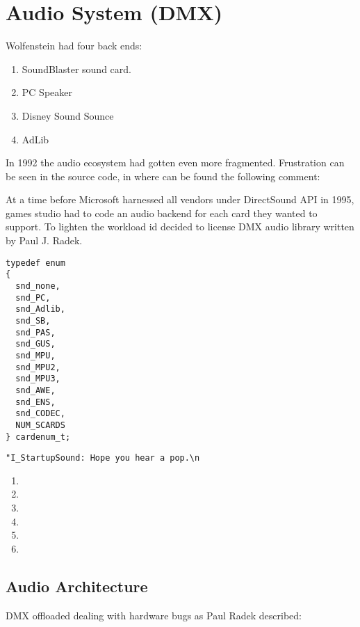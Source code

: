 \section{Audio System (DMX)}
\label{dmx_section}

Wolfenstein had four back ends:
\begin{enumerate}
\item SoundBlaster sound card.
\item PC Speaker
\item Disney Sound Sounce
\item AdLib
\end{enumerate}

In 1992 the audio ecosystem had gotten even more fragmented. Frustration can be seen in the source code, in  where can be found the following comment:\\
\par
{}
\par
At a time before Microsoft harnessed all vendors under DirectSound API in 1995, games studio had to code an audio backend for each card they wanted to support. To lighten the workload id decided to license DMX audio library written by Paul J. Radek.\\
\par
\begin{verbatim}
typedef enum
{
  snd_none,
  snd_PC,
  snd_Adlib,
  snd_SB,
  snd_PAS,
  snd_GUS,
  snd_MPU,
  snd_MPU2,
  snd_MPU3,
  snd_AWE,
  snd_ENS,
  snd_CODEC,
  NUM_SCARDS
} cardenum_t;
\end{verbatim}

\begin{verbatim}
"I_StartupSound: Hope you hear a pop.\n
\end{verbatim}

\begin{enumerate}
\item 
\item 
\item 
\item 
\item 
\item 
\end{enumerate}

\subsection{Audio Architecture}
DMX offloaded dealing with hardware bugs as Paul Radek described:

